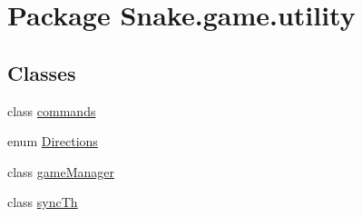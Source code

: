 \hypertarget{namespace_snake_1_1game_1_1utility}{}\section{Package Snake.\+game.\+utility}
\label{namespace_snake_1_1game_1_1utility}
\subsection*{Classes}
\begin{DoxyCompactItemize}
\item 
class \mbox{\hyperlink{class_snake_1_1game_1_1utility_1_1commands}{commands}}
\item 
enum \mbox{\hyperlink{enum_snake_1_1game_1_1utility_1_1_directions}{Directions}}
\item 
class \mbox{\hyperlink{class_snake_1_1game_1_1utility_1_1game_manager}{game\+Manager}}
\item 
class \mbox{\hyperlink{class_snake_1_1game_1_1utility_1_1sync_th}{sync\+Th}}
\end{DoxyCompactItemize}
